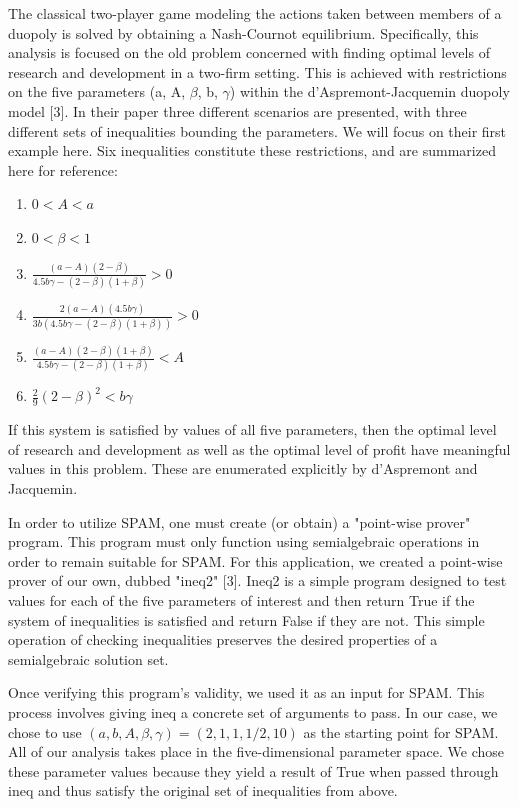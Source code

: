 \documentclass{article}
\begin{document}
The classical two-player game modeling the actions taken between members of a duopoly is solved by obtaining a Nash-Cournot equilibrium. Specifically, this analysis is focused on the old problem concerned with finding optimal levels of research and development in a two-firm setting. This is achieved with restrictions on the five parameters (a, A, $\beta$, b, $\gamma$) within the d'Aspremont-Jacquemin duopoly model [3]. In their paper three different scenarios are presented, with three different sets of inequalities bounding the parameters. We will focus on their first example here. Six inequalities constitute these restrictions, and are summarized here for reference:
\begin{enumerate}
\item$0 < A < a$
\item$0 < \beta < 1$
\item$\frac{(a - A)(2 - \beta)}{4.5b\gamma - (2-\beta)(1+\beta)} > 0$
\item$\frac{2(a-A)(4.5b\gamma)}{3b(4.5b\gamma-(2-\beta)(1+\beta))}>0$
\item$\frac{(a-A)(2-\beta)(1+\beta)}{4.5b\gamma-(2-\beta)(1+\beta)}<A$
\item$\frac{2}{9}(2-\beta)^{2}<b\gamma$
\end{enumerate}

If this system is satisfied by values of all five parameters, then the optimal level of research and development as well as the optimal level of profit have meaningful values in this problem. These are enumerated explicitly by d'Aspremont and Jacquemin.

In order to utilize SPAM, one must create (or obtain) a "point-wise prover" program. This program must only function using semialgebraic operations in order to remain suitable for SPAM. For this application, we created a point-wise prover of our own, dubbed "ineq2" [3]. Ineq2 is a simple program designed to test values for each of the five parameters of interest and then return True if the system of inequalities is satisfied and return False if they are not. This simple operation of checking inequalities preserves the desired properties of a semialgebraic solution set.

Once verifying this program's validity, we used it as an input for SPAM. This process involves giving ineq a concrete set of arguments to pass. In our case, we chose to use $(a, b, A, \beta, \gamma)=(2, 1, 1, 1/2, 10)$ as the starting point for SPAM. All of our analysis takes place in the five-dimensional parameter space. We chose these parameter values because they yield a result of True when passed through ineq and thus satisfy the original set of inequalities from above.
\end{document}
